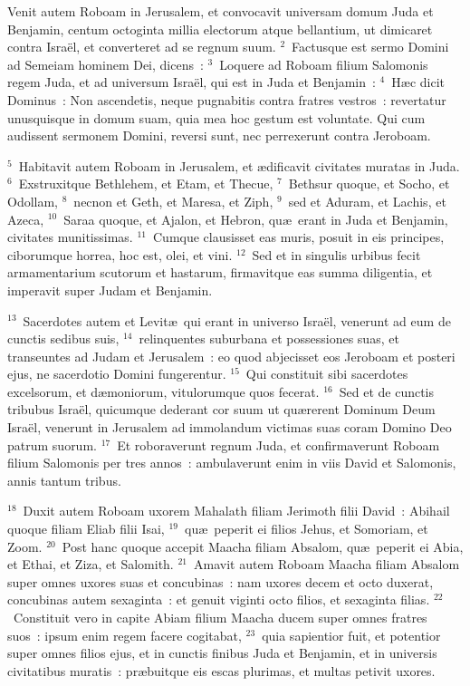 \bchapter
\lettrine[lines=3,image=true,loversize=0.05,lraise=-0.03]{V}{}enit autem Roboam in Jerusalem, et convocavit universam domum Juda et Benjamin, centum octoginta millia electorum atque bellantium, ut dimicaret contra Isra\"el, et converteret ad se regnum suum.
${}^{2}$~Factusque est sermo Domini ad Semeiam hominem Dei, dicens~:
${}^{3}$~Loquere ad Roboam filium Salomonis regem Juda, et ad universum Isra\"el, qui est in Juda et Benjamin~:
${}^{4}$~H\ae c dicit Dominus~: Non ascendetis, neque pugnabitis contra fratres vestros~: revertatur unusquisque in domum suam, quia mea hoc gestum est voluntate. Qui cum audissent sermonem Domini, reversi sunt, nec perrexerunt contra Jeroboam.


${}^{5}$~Habitavit autem Roboam in Jerusalem, et \ae dificavit civitates muratas in Juda.
${}^{6}$~Exstruxitque Bethlehem, et Etam, et Thecue,
${}^{7}$~Bethsur quoque, et Socho, et Odollam,
${}^{8}$~necnon et Geth, et Maresa, et Ziph,
${}^{9}$~sed et Aduram, et Lachis, et Azeca,
${}^{10}$~Saraa quoque, et Ajalon, et Hebron, qu\ae\ erant in Juda et Benjamin, civitates munitissimas.
${}^{11}$~Cumque clausisset eas muris, posuit in eis principes, ciborumque horrea, hoc est, olei, et vini.
${}^{12}$~Sed et in singulis urbibus fecit armamentarium scutorum et hastarum, firmavitque eas summa diligentia, et imperavit super Judam et Benjamin.


${}^{13}$~Sacerdotes autem et Levit\ae\ qui erant in universo Isra\"el, venerunt ad eum de cunctis sedibus suis,
${}^{14}$~relinquentes suburbana et possessiones suas, et transeuntes ad Judam et Jerusalem~: eo quod abjecisset eos Jeroboam et posteri ejus, ne sacerdotio Domini fungerentur.
${}^{15}$~Qui constituit sibi sacerdotes excelsorum, et d\ae moniorum, vitulorumque quos fecerat.
${}^{16}$~Sed et de cunctis tribubus Isra\"el, quicumque dederant cor suum ut qu\ae rerent Dominum Deum Isra\"el, venerunt in Jerusalem ad immolandum victimas suas coram Domino Deo patrum suorum.
${}^{17}$~Et roboraverunt regnum Juda, et confirmaverunt Roboam filium Salomonis per tres annos~: ambulaverunt enim in viis David et Salomonis, annis tantum tribus.


${}^{18}$~Duxit autem Roboam uxorem Mahalath filiam Jerimoth filii David~: Abihail quoque filiam Eliab filii Isai,
${}^{19}$~qu\ae\ peperit ei filios Jehus, et Somoriam, et Zoom.
${}^{20}$~Post hanc quoque accepit Maacha filiam Absalom, qu\ae\ peperit ei Abia, et Ethai, et Ziza, et Salomith.
${}^{21}$~Amavit autem Roboam Maacha filiam Absalom super omnes uxores suas et concubinas~: nam uxores decem et octo duxerat, concubinas autem sexaginta~: et genuit viginti octo filios, et sexaginta filias.
${}^{22}$~Constituit vero in capite Abiam filium Maacha ducem super omnes fratres suos~: ipsum enim regem facere cogitabat,
${}^{23}$~quia sapientior fuit, et potentior super omnes filios ejus, et in cunctis finibus Juda et Benjamin, et in universis civitatibus muratis~: pr\ae buitque eis escas plurimas, et multas petivit uxores.

